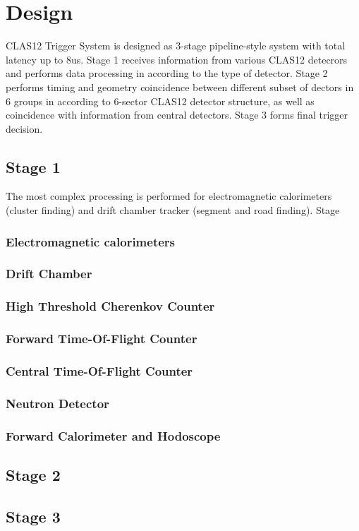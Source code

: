 \section{Design}

CLAS12 Trigger System is designed as 3-stage pipeline-style system with total latency up to 8us. Stage 1 receives information from various CLAS12 detecrors and performs data processing in according to the type of detector. Stage 2 performs timing and geometry coincidence between different subset of dectors in 6 groups in according to 6-sector CLAS12 detector structure, as well as coincidence with information from central detectors. Stage 3 forms final trigger decision.

\subsection{Stage 1} The most complex processing is performed for electromagnetic calorimeters (cluster finding) and drift chamber tracker (segment and road finding). Stage 

\subsubsection{Electromagnetic calorimeters}

\subsubsection{Drift Chamber}

\subsubsection{High Threshold Cherenkov Counter}

\subsubsection{Forward Time-Of-Flight Counter}

\subsubsection{Central Time-Of-Flight Counter}

\subsubsection{Neutron Detector}

\subsubsection{Forward Calorimeter and Hodoscope}


\subsection{Stage 2}


\subsection{Stage 3}

